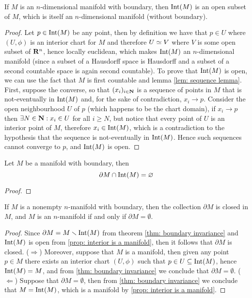 \begin{proposition}\label{prop: interior is a manifold}
  If \(M\) is an \(n\)-dimensional manifold with boundary, then \(\operatorname{Int}(M)\) is
  an open subset of \(M\), which is itself an \(n\)-dimensional manifold
  (without boundary).
\end{proposition}

\begin{proof}
  Let \(p \in \operatorname{Int}(M)\) be any point, then by definition we have that \(p \in
  U\) where \((U, \phi)\) is an interior chart for \(M\) and therefore \(U \simeq
  V\) where \(V\) is some open subset of \(\mathbf{R}^n\), hence locally
  euclidean, which makes \(\operatorname{Int}(M)\) an \(n\)-dimensional manifold (since a
  subset of a Hausdorff space is Hausdorff and a subset of a second countable
  space is again second countable). To prove that \(\operatorname{Int}(M)\) is open, we can
  use the fact that \(M\) is first countable and lemma \cref{lem: sequence
  lemma}. First, suppose the converse, so that \((x_i)_{i \in \mathbf{N}}\) is a
  sequence of points in \(M\) that is not-eventually in \(\operatorname{Int}(M)\) and, for the
  sake of contradiction, \(x_i \to p\). Consider the open neighbourhood \(U\) of
  \(p\) (which happens to be the chart domain), if \(x_i \to p\) then \(\exists
  N \in \mathbf{N}: x_i \in U\) for all \(i \geq N\), but notice that every
  point of \(U\) is an interior point of \(M\), therefore \(x_i \in \operatorname{Int}(M)\),
  which is a contradiction to the hypothesis that the sequence is not-eventually
  in \(\operatorname{Int}(M)\). Hence such sequences cannot converge to \(p\), and \(\operatorname{Int}(M)\)
  is open.
\end{proof}

\begin{theorem}\label{thm: boundary invariance}
  Let \(M\) be a manifold with boundary, then
  \[
    \partial M \cap \operatorname{Int}(M) = \varnothing
  \]
\end{theorem}

\begin{proof}
\end{proof}

\begin{corollary}
  If \(M\) is a nonempty \(n\)-manifold with boundary, then the collection
  \(\partial M\) is closed in \(M\), and \(M\) is an \(n\)-manifold if and only
  if \(\partial M = \emptyset\).
\end{corollary}

\begin{proof}
  Since \(\partial M = M \smallsetminus \operatorname{Int}(M)\) from theorem \cref{thm: boundary
  invariance} and \(\operatorname{Int}(M)\) is open from \cref{prop: interior is a manifold},
  then it follows that \(\partial M\) is closed. (\(\Rightarrow\)) Moreover,
  suppose that \(M\) is a manifold, then given any point \(p \in M\) there
  exists an interior chart \((U, \phi)\) such that \(p \in U \subseteq
  \operatorname{Int}(M)\), hence \(\operatorname{Int}(M) = M\), and from \cref{thm: boundary invariance} we
  conclude that \(\partial M = \emptyset\). (\(\Leftarrow\)) Suppose that
  \(\partial M = \emptyset\), then from \cref{thm: boundary invariance} we
  conclude that \(M = \operatorname{Int}(M)\), which is a manifold by \cref{prop: interior is a
  manifold}.
\end{proof}

